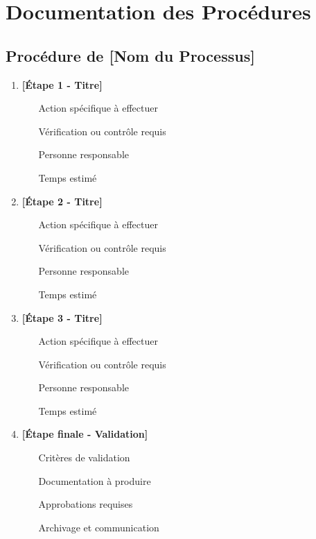 \section{Documentation des Procédures}
\label{app:procedures}

\subsection{Procédure de [Nom du Processus]}

\begin{enumerate}
\item \textbf{[Étape 1 - Titre]}
    \begin{itemize}
    \item [Action spécifique à effectuer]
    \item [Vérification ou contrôle requis]
    \item [Personne responsable]
    \item [Temps estimé]
    \end{itemize}

\item \textbf{[Étape 2 - Titre]}
    \begin{itemize}
    \item [Action spécifique à effectuer]
    \item [Vérification ou contrôle requis]
    \item [Personne responsable]
    \item [Temps estimé]
    \end{itemize}

\item \textbf{[Étape 3 - Titre]}
    \begin{itemize}
    \item [Action spécifique à effectuer]
    \item [Vérification ou contrôle requis]
    \item [Personne responsable]
    \item [Temps estimé]
    \end{itemize}

\item \textbf{[Étape finale - Validation]}
    \begin{itemize}
    \item [Critères de validation]
    \item [Documentation à produire]
    \item [Approbations requises]
    \item [Archivage et communication]
    \end{itemize}
\end{enumerate}

